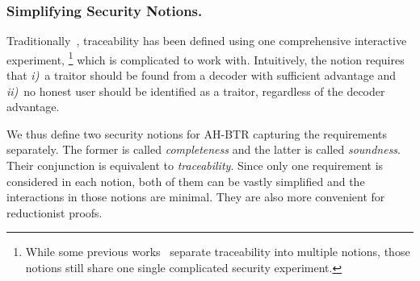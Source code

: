 \subsubsection{Simplifying Security Notions.}
Traditionally~\cite{EC:BonSahWat06}, traceability has been defined using one comprehensive interactive experiment,%
\footnote{While some previous works~\cite{C:BonFra99,STOC:GoyKopWat18,C:Zhandry20} separate traceability into multiple notions,
those notions still share one single complicated security experiment.}
which is complicated to work with.
Intuitively, the notion requires that
\emph{i)}~a traitor should be found from a decoder with sufficient advantage and
\emph{ii)}~no honest user should be identified as a traitor, regardless of the decoder advantage.

We thus define two security notions for AH-BTR capturing the requirements separately.
The former is called \emph{completeness} and the latter is called \emph{soundness}.
Their conjunction is equivalent to \emph{traceability}.
Since only one requirement is considered in each notion,
both of them can be vastly simplified and the interactions in those notions are minimal.
They are also more convenient for reductionist proofs.
